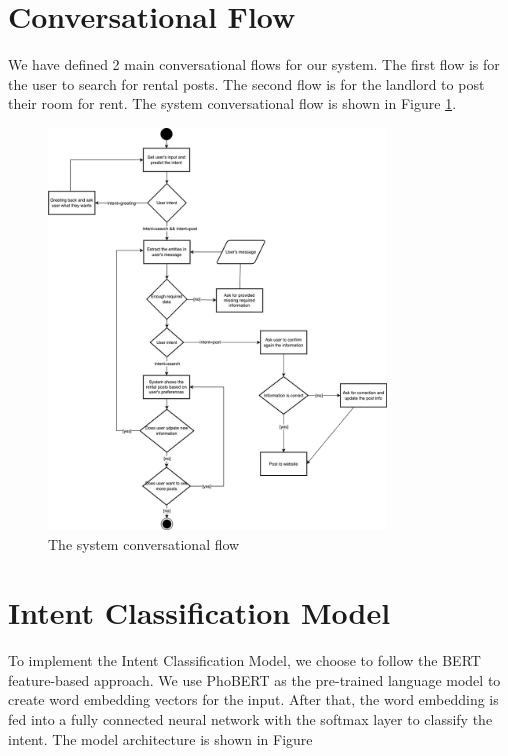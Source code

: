 \section{Conversational Flow}

We have defined 2 main conversational flows for our system. The first flow is for the user to search for rental posts. The second flow is for the landlord to post their room for rent. The system conversational flow is shown in Figure \ref{fig:conversational-flow}.

\begin{figure}[ht]
    \centering
    \includegraphics[width=0.8\textwidth]{../Images/7.System_Modeling/conversational_flow.png}
    \caption{The system conversational flow}
    \label{fig:conversational-flow}
\end{figure}

\section{Intent Classification Model}
\label{sec:intent-classification-model}
To implement the Intent Classification Model, we choose to follow the BERT feature-based approach. We use PhoBERT as the pre-trained language model to create word embedding vectors for the input. After that, the word embedding is fed into a fully connected neural network with the softmax layer to classify the intent. The model architecture is shown in Figure

